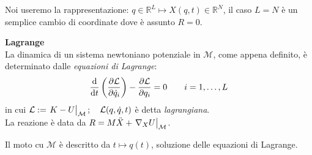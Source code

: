 Noi useremo la rappresentazione: $q \in \mathbb{R}^L \mapsto X(q, t) \in \mathbb{R}^N$, 
il caso $L= N$ è un semplice cambio di coordinate dove è assunto $R =0$.
\begin{theorem}
    \textbf{Lagrange}\\
    La dinamica di un sistema newtoniano potenziale in $\mathcal{M}$, come appena definito, è determinato dalle \textit{equazioni di Lagrange}:
    \begin{equation}
        \dv{}{t}\left( \pdv{\mathcal{L}}{\dot{q}_i} \right)-\pdv{\mathcal{L}}{q_i}=0 \qquad i = 1,\dots, L 
    \end{equation}
    in cui $\mathcal{L}:= \eval{K-U}_{\mathcal{M}};\quad \mathcal{L}(q,\dot{q},t)$ è detta \textit{lagrangiana}. \\
    La reazione è data da $R = M\ddot{X}+\eval{\nabla_X U }_{\mathcal{M}}$.
\end{theorem}
\begin{remark}
    Il moto cu $\mathcal{M}$ è descritto da $t\mapsto q(t)$, soluzione delle equazioni di Lagrange.
\end{remark}
